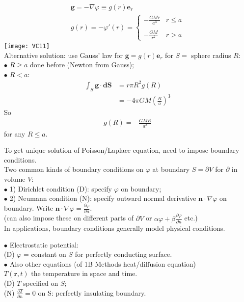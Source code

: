\documentclass[a4paper]{article}
\begin{document}
\begin{eg}
\begin{equation*}
\begin{aligned}
\mathbf{g} = -\nabla \varphi \equiv g\left(r\right) \mathbf{e}_r\\
g\left(r\right) = -\varphi'\left(r\right) = \left\{
\begin{array}{ll}
-\frac{GMr}{a^3} & r\leq a\\\\
-\frac{GM}{r^2} & r>a
\end{array}
\right.
\end{aligned}
\end{equation*}
\texttt{[image: VC11]}\\
Alternative solution: use Gauss' law for $\mathbf{g}=g\left(r\right)\mathbf{e}_r$ for $S=$ sphere radius $R$:\\
$\bullet$ $R\geq a$ done before (Newton from Gauss);\\
$\bullet$ $R<a$:
\begin{equation*}
\begin{aligned}
\int_S \mathbf{g}\cdot\mathbf{dS} &= r\pi R^2 g\left(R\right)\\
&= -4\pi GM\left(\frac{R}{a}\right)^3
\end{aligned}
\end{equation*}
So
\begin{equation*}
\begin{aligned}
g\left(R\right) = -\frac{GMR}{a^3}
\end{aligned}
\end{equation*}
for any $R\leq a$.
\end{eg}

To get unique solution of Poisson/Laplace equation, need to impose boundary conditions.\\
Two common kinds of boundary conditions on $\varphi$ at boundary $S=\partial V$ for $\partial$ in volume $V$:\\
$\bullet$ 1) Dirichlet condition (D): specify $\varphi$ on boundary;\\
$\bullet$ 2) Neumann condition (N): specify outward normal derivative $\mathbf{n} \cdot \nabla\varphi$ on boundary. Write $\mathbf{n}\cdot\nabla\varphi = \frac{\partial\varphi}{\partial n}$.\\
(can also impose these on different parts of $\partial V$ or $\alpha \varphi + \beta \frac{\partial \varphi}{\partial n}$ etc.)\\
In applications, boundary conditions generally model physical conditions.\\

\begin{eg}
$\bullet$ Electrostatic potential:\\
(D) $\varphi$ = constant on $S$ for perfectly conducting surface.\\
$\bullet$ Also other equations (of 1B Methods heat/diffusion equation)\\
$T\left(\mathbf{r},t\right)$ the temperature in space and time.\\
(D) $T$ specified on $S$;\\
(N) $\frac{\partial T}{\partial n} = 0$ on S: perfectly insulating boundary.
\end{eg}
\end{document}
